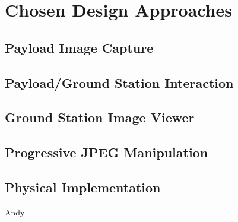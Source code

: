 \chapter{Chosen Design Approaches}


\section{Payload Image Capture}

\section{Payload/Ground Station Interaction}

\section{Ground Station Image Viewer}

\section{Progressive JPEG Manipulation}

\section{Physical Implementation}
Andy

